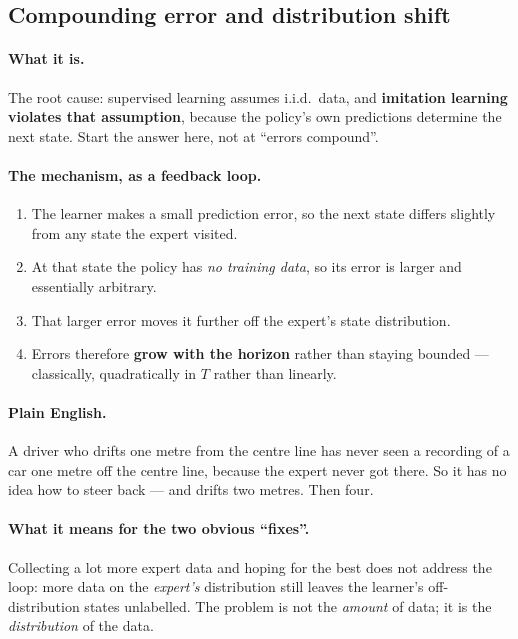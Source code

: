 \documentclass[11pt,a4paper]{article}
\begin{document}
\subsection{Compounding error and distribution shift}

\paragraph{What it is.} The root cause: supervised learning assumes i.i.d.\
data, and \textbf{imitation learning violates that assumption}, because the
policy's own predictions determine the next state. Start the answer here,
not at ``errors compound''.

\paragraph{The mechanism, as a feedback loop.}
\begin{enumerate}[label=\arabic*.]
\item The learner makes a small prediction error, so the next state differs
slightly from any state the expert visited.
\item At that state the policy has \emph{no training data}, so its error is
larger and essentially arbitrary.
\item That larger error moves it further off the expert's state distribution.
\item Errors therefore \textbf{grow with the horizon} rather than staying
bounded --- classically, quadratically in $T$ rather than linearly.
\end{enumerate}

\paragraph{Plain English.} A driver who drifts one metre from the centre line
has never seen a recording of a car one metre off the centre line, because the
expert never got there. So it has no idea how to steer back --- and drifts two
metres. Then four.

\paragraph{What it means for the two obvious ``fixes''.} Collecting a lot more
expert data and hoping for the best does not address the loop: more data on
the \emph{expert's} distribution still leaves the learner's off-distribution
states unlabelled. The problem is not the \emph{amount} of data; it is the
\emph{distribution} of the data.
\end{document}
